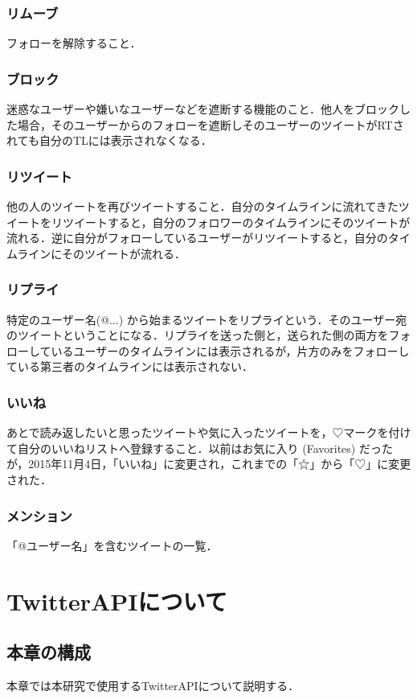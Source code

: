 \subsection{リムーブ}
フォローを解除すること．

\subsection{ブロック}
迷惑なユーザーや嫌いなユーザーなどを遮断する機能のこと．他人をブロックした場合，そのユーザーからのフォローを遮断しそのユーザーのツイートがRTされても自分のTLには表示されなくなる．

\subsection{リツイート}
他の人のツイートを再びツイートすること．自分のタイムラインに流れてきたツイートをリツイートすると，自分のフォロワーのタイムラインにそのツイートが流れる．逆に自分がフォローしているユーザーがリツイートすると，自分のタイムラインにそのツイートが流れる．

\subsection{リプライ}
特定のユーザー名(@...) から始まるツイートをリプライという．そのユーザー宛のツイートということになる．リプライを送った側と，送られた側の両方をフォローしているユーザーのタイムラインには表示されるが，片方のみをフォローしている第三者のタイムラインには表示されない．

\subsection{いいね}
あとで読み返したいと思ったツイートや気に入ったツイートを，♡マークを付けて自分のいいねリストへ登録すること．以前はお気に入り (Favorites) だったが，2015年11月4日，「いいね」に変更され，これまでの「☆」から「♡」に変更された．

\subsection{メンション}
「@ユーザー名」を含むツイートの一覧．

\chapter{TwitterAPIについて}

\section{本章の構成}
本章では本研究で使用するTwitterAPIについて説明する．

